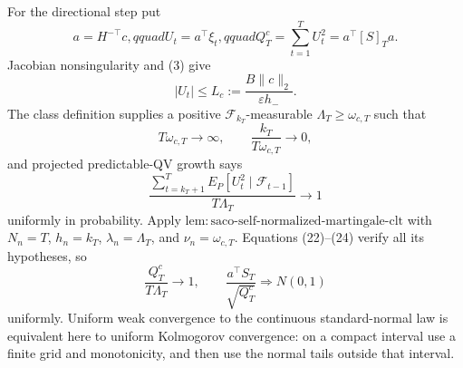 For the directional step put
\[
 a=H^{-\top}c,qquad U_t=a^\top\xi_t,qquad
 Q_T^c=\sum_{t=1}^TU_t^2=a^\top[S]_Ta.
\tag{21}
\]
Jacobian nonsingularity and (3) give
\[
 |U_t|\le L_c:=\frac{B\|c\|_2}{\varepsilon h_-}.
\tag{22}
\]
The class definition supplies a positive \(\mathcal F_{k_T}\)-measurable \(\Lambda_T\ge\omega_{c,T}\) such that
\[
 T\omega_{c,T}\longrightarrow\infty,
 \qquad \frac{k_T}{T\omega_{c,T}}\longrightarrow0,
\tag{23}
\]
and projected predictable-QV growth says
\[
 \frac{\sum_{t=k_T+1}^TE_P[U_t^2\mid\mathcal F_{t-1}]}
 {T\Lambda_T}\longrightarrow1
\tag{24}
\]
uniformly in probability.  Apply \(\mathrm{lem:saco\text{-}self\text{-}normalized\text{-}martingale\text{-}clt}\) with \(N_n=T\), \(h_n=k_T\), \(\lambda_n=\Lambda_T\), and \(\nu_n=\omega_{c,T}\).  Equations (22)--(24) verify all its hypotheses, so
\[
 \frac{Q_T^c}{T\Lambda_T}\longrightarrow1,
 \qquad \frac{a^\top S_T}{\sqrt{Q_T^c}}\Rightarrow N(0,1)
\tag{25}
\]
uniformly.  Uniform weak convergence to the continuous standard-normal law is equivalent here to uniform Kolmogorov convergence: on a compact interval use a finite grid and monotonicity, and then use the normal tails outside that interval.

